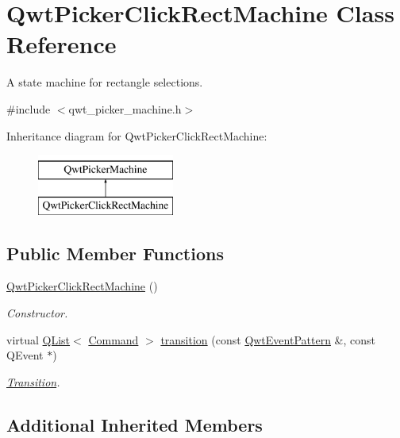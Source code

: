 \hypertarget{class_qwt_picker_click_rect_machine}{\section{Qwt\-Picker\-Click\-Rect\-Machine Class Reference}
\label{class_qwt_picker_click_rect_machine}
}


A state machine for rectangle selections.  




{\ttfamily \#include $<$qwt\-\_\-picker\-\_\-machine.\-h$>$}

Inheritance diagram for Qwt\-Picker\-Click\-Rect\-Machine\-:\begin{figure}[H]
\begin{center}
\leavevmode
\includegraphics[height=2.000000cm]{class_qwt_picker_click_rect_machine}
\end{center}
\end{figure}
\subsection*{Public Member Functions}
\begin{DoxyCompactItemize}
\item 
\hyperlink{class_qwt_picker_click_rect_machine_ac154f2cb83e86f8b5d9d410c53b4bdb4}{Qwt\-Picker\-Click\-Rect\-Machine} ()
\begin{DoxyCompactList}\small\item\em Constructor. \end{DoxyCompactList}\item 
virtual \hyperlink{class_q_list}{Q\-List}$<$ \hyperlink{class_qwt_picker_machine_a3a8d3d4c107ce5f8351e4cbdd38c43f7}{Command} $>$ \hyperlink{class_qwt_picker_click_rect_machine_add912362fad567108cad0a8a506aaf25}{transition} (const \hyperlink{class_qwt_event_pattern}{Qwt\-Event\-Pattern} \&, const Q\-Event $\ast$)
\begin{DoxyCompactList}\small\item\em \hyperlink{class_transition}{Transition}. \end{DoxyCompactList}\end{DoxyCompactItemize}
\subsection*{Additional Inherited Members}



